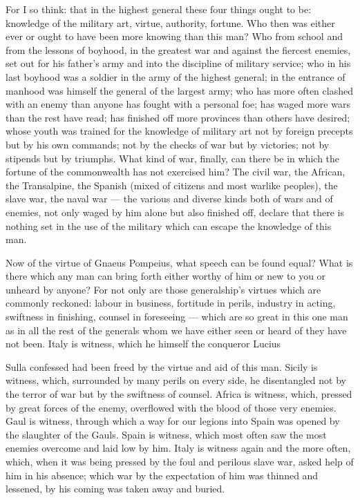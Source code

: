  For I so think: that in the highest general these four things ought to be: knowledge of the military art, virtue, authority, fortune. Who then was either ever or ought to have been more knowing than this man? Who from school and from the lessons of boyhood, in the greatest war and against the fiercest enemies, set out for his father's army and into the discipline of military service; who in his last boyhood was a soldier in the army of the highest general; in the entrance of manhood was himself the general of the largest army; who has more often clashed with an enemy than anyone has fought with a personal foe; has waged more wars than the rest have read; has finished off more provinces than others have desired; whose youth was trained for the knowledge of military art not by foreign precepts but by his own commands; not by the checks of war but by victories; not by stipends but by triumphs. What kind of war, finally, can there be in which the fortune of the commonwealth has not exercised him? The civil war, the African, the Transalpine, the Spanish (mixed of citizens and most warlike peoples), the slave war, the naval war --- the various and diverse kinds both of wars and of enemies, not only waged by him alone but also finished off, declare that there is nothing set in the use of the military which can escape the knowledge of this man.

 Now of the virtue of Gnaeus Pompeius, what speech can be found equal? What is there which any man can bring forth either worthy of him or new to you or unheard by anyone? For not only are those generalship's virtues which are commonly reckoned: labour in business, fortitude in perils, industry in acting, swiftness in finishing, counsel in foreseeing --- which are so great in this one man as in all the rest of the generals whom we have either seen or heard of they have not been. Italy is witness, which he himself the conqueror Lucius

 Sulla confessed had been freed by the virtue and aid of this man. Sicily is witness, which, surrounded by many perils on every side, he disentangled not by the terror of war but by the swiftness of counsel. Africa is witness, which, pressed by great forces of the enemy, overflowed with the blood of those very enemies. Gaul is witness, through which a way for our legions into Spain was opened by the slaughter of the Gauls. Spain is witness, which most often saw the most enemies overcome and laid low by him. Italy is witness again and the more often, which, when it was being pressed by the foul and perilous slave war, asked help of him in his absence; which war by the expectation of him was thinned and lessened, by his coming was taken away and buried.

